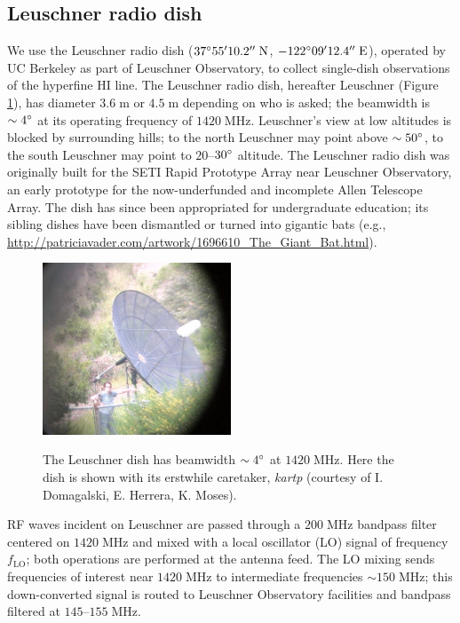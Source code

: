 \documentclass[10pt]{article}
\newcommand {\mt}{\mathrm}
\newcommand {\unit}[1]{\; \mt{#1}}
\begin{document}
\subsection{Leuschner radio dish}

We use the Leuschner radio dish ($37\degree 55' 10.2'' \unit{N}$, $-122\degree 09' 12.4'' \unit{E}$), operated by UC Berkeley as part of Leuschner Observatory, to collect single-dish observations of the hyperfine HI line.  The Leuschner radio dish, hereafter Leuschner (Figure \ref{fig:kartp}), has diameter $3.6\unit{m}$ or $4.5\unit{m}$ depending on who is asked; the beamwidth is $\sim4\degree$ at its operating frequency of $1420 \unit{MHz}$.  Leuschner's view at low altitudes is blocked by surrounding hills; to the north Leuschner may point above $\sim50\degree$, to the south Leuschner may point to $20$--$30\degree$ altitude.  The Leuschner radio dish was originally built for the SETI Rapid Prototype Array near Leuschner Observatory, an early prototype for the now-underfunded and incomplete Allen Telescope Array.  The dish has since been appropriated for undergraduate education; its sibling dishes have been dismantled or turned into gigantic bats (e.g., \href{http://patriciavader.com/artwork/1696610\_The\_Giant\_Bat.html}{http://patriciavader.com/artwork/1696610\_The\_Giant\_Bat.html}).

\begin{figure}[!ht]
    \centering
    \includegraphics[width=0.5\textwidth]{kartp.png} \\
    \caption{The Leuschner dish has beamwidth $\sim 4 \degree$ at $1420 \unit{MHz}$.  Here the dish is shown with its erstwhile caretaker, \emph{kartp} (courtesy of I. Domagalski, E. Herrera, K. Moses).}
    \label{fig:kartp}
\end{figure}

RF waves incident on Leuschner are passed through a $200 \unit{MHz}$ bandpass filter centered on $1420 \unit{MHz}$ and mixed with a local oscillator (LO) signal of frequency $f_{\mt{LO}}$; both operations are performed at the antenna feed.  The LO mixing sends frequencies of interest near $1420 \unit{MHz}$ to intermediate frequencies $\sim150 \unit{MHz}$; this down-converted signal is routed to Leuschner Observatory facilities and bandpass filtered at $145$--$155 \unit{MHz}$.
\end{document}
